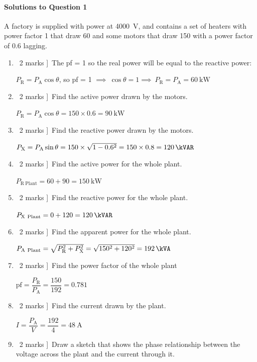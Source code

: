 \documentclass[a4paper,12pt,fleqn]{article}
\begin{document}
\paragraph{\textbf{Solutions to Question 1}}
A factory is supplied with power at \SI{4000}{\volt}, and contains a set of heaters with power factor 1 that draw \SI{60}{\kVA} and some motors that draw \SI{150}{\kVA} with a power factor of 0.6 lagging.
\begin{enumerate}[label=\alph*)]

\item \lbrack\ 2 marks ]\ The pf = 1 so the real power  will be equal to the reactive power:\par
\indent $P_\mathrm{R}=P_\mathrm{A}\cos\theta$, so pf = 1 $\implies\ \cos\theta =1\implies\ P_\mathrm{R}=P_\mathrm{A}=\SI{60}{\kilo\watt}$
\item \lbrack\ 2 marks ]\ Find the active power drawn by the motors.\par
$P_\mathrm{R}=P_\mathrm{A}\cos\theta=150\times 0.6=\SI{90}{\kilo\watt}$
\item \lbrack\ 2 marks ]\ Find the reactive power drawn by the motors.\par
$P_\mathrm{X}=P_\mathrm{A}\sin\theta=150\times\sqrt{1-0.6^2}=150\times 0.8=\SI{120}{\kVAR}$
\item \lbrack\ 2 marks ]\ Find the active power for the whole plant.\par
$P_\mathrm{R\ Plant}=60+90=\SI{150}{\kilo\watt}$
\item \lbrack\ 2 marks ]\ Find the reactive power for the whole plant.\par
$P_\mathrm{X\ Plant}=0+120=\SI{120}{\kVAR}$
\item \lbrack\ 2 marks ]\ Find the apparent power for the whole plant.\par
$P_\mathrm{A\ Plant}=\sqrt{P^2_\mathrm{R}+P^2_\mathrm{X}}=\sqrt{150^2+120^2}=\SI{192}{\kVA}$
\item \lbrack\ 2 marks ]\ Find the power factor of the whole plant\par
$\mathrm{pf}=\dfrac{P_\mathrm{R}}{P_\mathrm{A}}=\dfrac{150}{192}=0.781$
\item \lbrack\ 2 marks ]\ Find the current drawn by the plant.\par
$I=\dfrac{P_\mathrm{A}}{V}=\dfrac{192}{4}=\SI{48}{\ampere}$
\item \lbrack\ 2 marks ]\ Draw a sketch that shows the phase relationship between the voltage across the plant and the current through it.


\end{enumerate}
\end{document}

